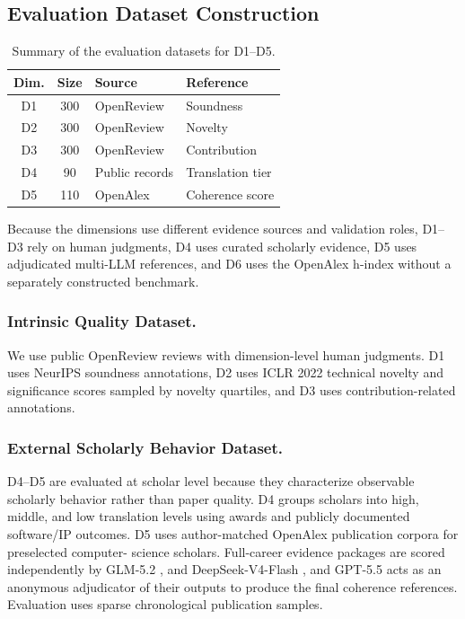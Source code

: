 \documentclass[letterpaper]{article} %
\begin{document}
\subsection{Evaluation Dataset Construction}

\begin{table}[t]
\centering
\begin{tabular}{@{}ccll@{}}
\toprule
\textbf{Dim.} & \textbf{Size} & \textbf{Source} & \textbf{Reference} \\
\midrule
D1 & 300 & OpenReview & Soundness \\
D2 & 300 & OpenReview & Novelty \\
D3 & 300 & OpenReview & Contribution \\
D4 & 90  & Public records & Translation tier \\
D5 & 110 & OpenAlex & Coherence score \\
\bottomrule
\end{tabular}
\caption{Summary of the evaluation datasets for D1--D5.}
\label{tab:evaluation_datasets}
\end{table}


Because the dimensions use different evidence sources and validation roles, D1--D3 rely on human judgments, D4
uses curated scholarly evidence, D5 uses adjudicated multi-LLM references, and D6 uses the OpenAlex h-index
without a separately constructed benchmark.

\subsubsection{Intrinsic Quality Dataset.}
We use public OpenReview reviews with dimension-level human judgments. D1 uses NeurIPS soundness annotations,
D2 uses ICLR 2022 technical novelty and significance scores sampled by novelty quartiles, and D3 uses
contribution-related annotations.

\subsubsection{External Scholarly Behavior Dataset.}
D4--D5 are evaluated at scholar level because they characterize observable scholarly behavior rather than
paper quality. D4 groups scholars into high, middle, and low translation levels using awards and publicly
documented software/IP outcomes. D5 uses author-matched OpenAlex publication corpora for preselected computer-
science scholars. Full-career evidence packages are scored independently by GLM-5.2 \cite{zai2026glm52}, and DeepSeek-V4-Flash \cite{deepseek2026v4}, and GPT-5.5 \cite{openai2026gpt55} acts as an anonymous adjudicator of their outputs to produce the final coherence references. Evaluation uses sparse chronological publication samples.
\end{document}
